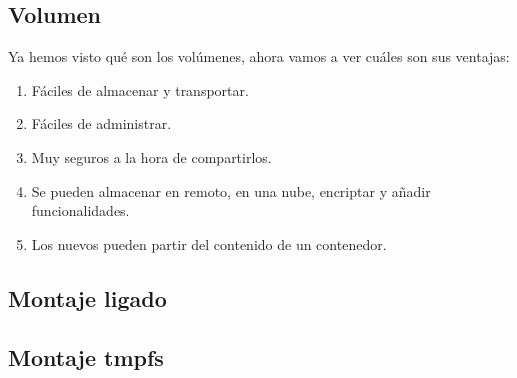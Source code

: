 \documentclass[]{article}
\begin{document}
\subsection{Volumen}
Ya hemos visto qué son los volúmenes, ahora vamos a ver cuáles son sus ventajas:
\begin{enumerate}
	\renewcommand{\labelenumi}{$\bullet$}
	\item Fáciles de almacenar y transportar.
	\item Fáciles de administrar.
	\item Muy seguros a la hora de compartirlos.
	\item Se pueden almacenar en remoto, en una nube, encriptar y añadir funcionalidades.
	\item Los nuevos pueden partir del contenido de un contenedor.
\end{enumerate}



\subsection{Montaje ligado}

\subsection{Montaje tmpfs}
\end{document}
